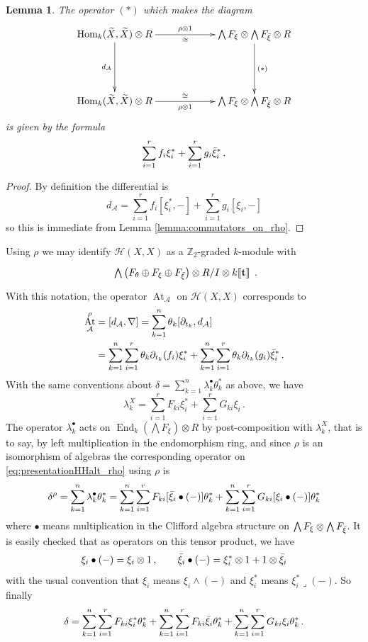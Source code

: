 \documentclass[english,letter paper,12pt,leqno]{article}
\newtheorem{lemma}[theorem]{Lemma}
\theoremstyle{example}
\numberwithin{equation}{section}
\def\AA{\mathcal{A}}
\def\HH{\HH}
\def\HH{\mathcal{H}}
\def\Hom{\operatorname{Hom}}
\def\be{\begin{equation}}
\def\ee{\end{equation}}
\def\nZ{\mathds{Z}}
\DeclareMathOperator{\End}{End}
\DeclareMathOperator{\vAt}{At}
\begin{document}
\begin{lemma}\label{lemma:transfer_rho} The operator $(*)$ which makes the diagram
\[
\xymatrix@C+3pc@R+2pc{
\Hom_k( \widetilde{X}, \widetilde{X} ) \otimes R \ar[d]_-{d_{\AA}} \ar[r]_-{\cong}^-{ \rho \otimes 1} & \bigwedge F_\xi \otimes \bigwedge F_{\Bar{\xi}} \otimes R \ar[d]^-{(*)}\\
\Hom_k( \widetilde{X}, \widetilde{X} ) \otimes R \ar[r]^-{\cong}_-{ \rho \otimes 1 } & \bigwedge F_\xi \otimes \bigwedge F_{\Bar{\xi}} \otimes R
}
\]
is given by the formula
\[
\sum_{i=1}^r f_i \xi_i^* + \sum_{i=1}^r g_i \Bar{\xi}_i^*\,.
\]
\end{lemma}
\begin{proof}
By definition the differential is
\[
d_{\AA} = \sum_{i=1}^r f_i [ \xi_i^*, - ] + \sum_{i=1}^r g_i [ \xi_i, - ]
\]
so this is immediate from Lemma \ref{lemma:commutators_on_rho}.
\end{proof}

Using $\rho$ we may identify $\HH(X,X)$ as a $\nZ_2$-graded $k$-module with
\be\label{eq:presentationHHalt_rho}
\xymatrix@C+2pc{
\bigwedge \big( F_\theta \oplus F_\xi \oplus F_{\Bar{\xi}} \big) \otimes R/I \otimes k\llbracket \bold{t} \rrbracket
}\,.
\ee
With this notation, the operator $\vAt_{\AA}$ on $\HH(X,X)$ corresponds to
\begin{align*}
\vAt^\rho_{\AA} &= [ d_{\AA}, \nabla ] = \sum_{k=1}^n \theta_k [ \partial_{t_k}, d_{\AA} ]\\
&= \sum_{k=1}^n \sum_{i=1}^r \theta_k \partial_{t_k}(f_i) \xi_i^* + \sum_{k=1}^n \sum_{i=1}^r \theta_k \partial_{t_k}(g_i) \Bar{\xi}_i^*\,.
\end{align*}
With the same conventions about $\delta = \sum_{k=1}^n \lambda^\bullet_k \theta_k^*$ as above, we have
\be
\lambda^X_k = \sum_{i=1}^r F_{ki} \xi_i^* + \sum_{i=1}^r G_{ki} \xi_i\,.
\ee
The operator $\lambda_k^\bullet$ acts on $\End_k( \bigwedge F_\xi ) \otimes R$ by post-composition with $\lambda^X_k$, that is to say, by left multiplication in the endomorphism ring, and since $\rho$ is an isomorphism of algebras the corresponding operator on \eqref{eq:presentationHHalt_rho} using $\rho$ is
\be
\delta^\rho = \sum_{k=1}^n \lambda^\bullet_k \theta_k^* = \sum_{k=1}^n \sum_{i=1}^r F_{ki} [\Bar{\xi}_i \bullet (-)] \theta_k^* + \sum_{k=1}^n \sum_{i=1}^r G_{ki} [\xi_i \bullet (-)] \theta_k^*
\ee
where $\bullet$ means multiplication in the Clifford algebra structure on $\bigwedge F_\xi \otimes \bigwedge F_{\Bar{\xi}}$. It is easily checked that as operators on this tensor product, we have
\[
\xi_i \bullet (-) = \xi_i \otimes 1\,, \qquad \Bar{\xi}_i \bullet (-) = \xi_i^* \otimes 1 + 1 \otimes \Bar{\xi}_i
\]
with the usual convention that $\xi_i$ means $\xi_i \wedge (-)$ and $\xi_i^*$ means $\xi_i^* \lrcorner (-)$. So finally
\be
\delta = \sum_{k=1}^n \sum_{i=1}^r F_{ki} \xi_i^* \theta_k^* + \sum_{k=1}^n \sum_{i=1}^r F_{ki} \Bar{\xi}_i \theta_k^* + \sum_{k=1}^n \sum_{i=1}^r G_{ki} \xi_i \theta_k^*\,.
\ee
\end{document}
